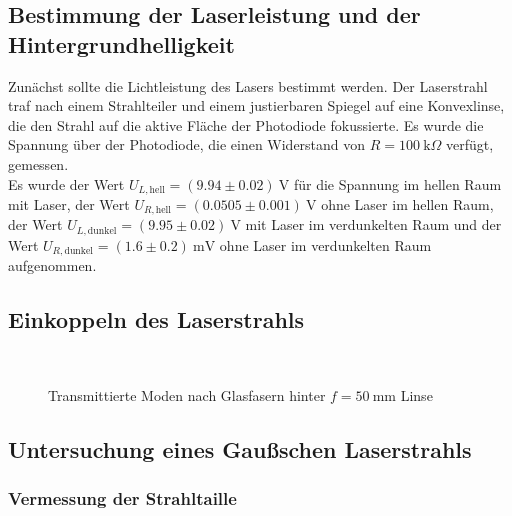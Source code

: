 \documentclass[11pt,a4paper,oneside]{scrartcl}
\begin{document}
\subsection{Bestimmung der Laserleistung und der Hintergrundhelligkeit}
Zunächst sollte die Lichtleistung des Lasers bestimmt werden. Der Laserstrahl traf nach einem Strahlteiler und einem justierbaren Spiegel auf eine Konvexlinse, die den Strahl auf die aktive Fläche der Photodiode fokussierte. Es wurde die Spannung über der Photodiode, die einen Widerstand von $R=100\ \mathrm{k}\Omega$ verfügt, gemessen. \\
Es wurde der Wert $U_{L,\mathrm{hell}}=(9.94\pm 0.02)\ \mathrm V$ für die Spannung im hellen Raum mit Laser, der Wert $U_{R,\mathrm{hell}}=(0.0505\pm 0.001)\ \mathrm V$ ohne Laser im hellen Raum, der Wert  $U_{L,\mathrm{dunkel}}=(9.95\pm 0.02)\ \mathrm V$ mit Laser im verdunkelten Raum und der Wert  $U_{R,\mathrm{dunkel}}=(1.6\pm 0.2)\ \mathrm{mV}$ ohne Laser im verdunkelten Raum aufgenommen.
 
\subsection{Einkoppeln des Laserstrahls}
\begin{figure}[H]
\setcounter{imEnv}{1}
    \centering
  \\
   \caption{Transmittierte Moden nach Glasfasern hinter $f=50\ \mathrm{mm}$ Linse}
    \label{FotostreckeGlasfasern}
\end{figure}
\subsection{Untersuchung eines Gaußschen Laserstrahls}

\subsubsection{Vermessung der Strahltaille}


\end{document}
